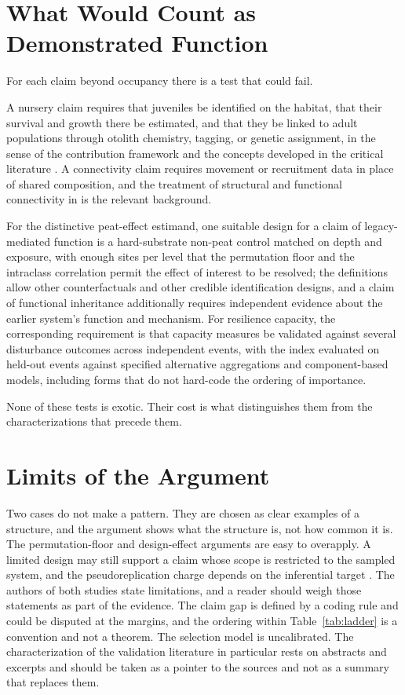 \documentclass[11pt]{article}
\theoremstyle{definition}
\theoremstyle{remark}
\begin{document}
\section{What Would Count as Demonstrated Function}

For each claim beyond occupancy there is a test that could fail.

A nursery claim requires that juveniles be identified on the habitat, that their survival and growth there be estimated, and that they be linked to adult populations through otolith chemistry, tagging, or genetic assignment, in the sense of the contribution framework \cite{beck2001} and the concepts developed in the critical literature \cite{sheaves2006,dahlgren2006}. A connectivity claim requires movement or recruitment data in place of shared composition, and the treatment of structural and functional connectivity in \cite{taylor2006} is the relevant background.

For the distinctive peat-effect estimand, one suitable design for a claim of legacy-mediated function is a hard-substrate non-peat control matched on depth and exposure, with enough sites per level that the permutation floor and the intraclass correlation permit the effect of interest to be resolved; the definitions allow other counterfactuals and other credible identification designs, and a claim of functional inheritance additionally requires independent evidence about the earlier system's function and mechanism. For resilience capacity, the corresponding requirement is that capacity measures be validated against several disturbance outcomes across independent events, with the index evaluated on held-out events against specified alternative aggregations and component-based models, including forms that do not hard-code the ordering of importance.

None of these tests is exotic. Their cost is what distinguishes them from the characterizations that precede them.

\section{Limits of the Argument}

Two cases do not make a pattern. They are chosen as clear examples of a structure, and the argument shows what the structure is, not how common it is. The permutation-floor and design-effect arguments are easy to overapply. A limited design may still support a claim whose scope is restricted to the sampled system, and the pseudoreplication charge depends on the inferential target \cite{oksanen2001,davies2015}. The authors of both studies state limitations, and a reader should weigh those statements as part of the evidence. The claim gap is defined by a coding rule and could be disputed at the margins, and the ordering within Table~\ref{tab:ladder} is a convention and not a theorem. The selection model is uncalibrated. The characterization of the validation literature in particular rests on abstracts and excerpts and should be taken as a pointer to the sources and not as a summary that replaces them.
\end{document}
